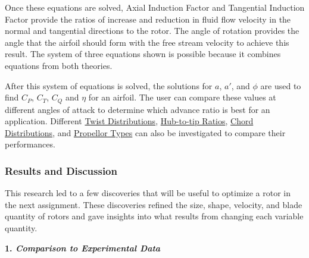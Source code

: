 \documentclass{article}
\begin{document}
Once these equations are solved, Axial Induction Factor and Tangential Induction Factor provide the ratios of increase and reduction in fluid flow velocity in the normal and tangential directions to the rotor. The angle of rotation provides the angle that the airfoil should form with the free stream velocity to achieve this result. The system of three equations shown is possible because it combines equations from both theories. \newline

After this system of equations is solved, the solutions for $a$, $a'$, and $\phi$ are used to find $C_{P}$, $C_{T}$, $C_{Q}$ and $\eta$ for an airfoil. The user can compare these values at different angles of attack to determine which advance ratio is best for an application. Different \hyperlink{T}{Twist Distributions}, \hyperlink{D/D}{Hub-to-tip Ratios}, \hyperlink{c}{Chord Distributions}, and \hyperlink{APC}{Propellor Types} can also be investigated to compare their performances. \newline

\subsubsection*{Results and Discussion}

This research led to a few discoveries that will be useful to optimize a rotor in the next assignment. These discoveries refined the size, shape, velocity, and blade quantity of rotors and gave insights into what results from changing each variable quantity. \newline

\textbf{1. \emph{Comparison to Experimental Data}} \newline
\end{document}
